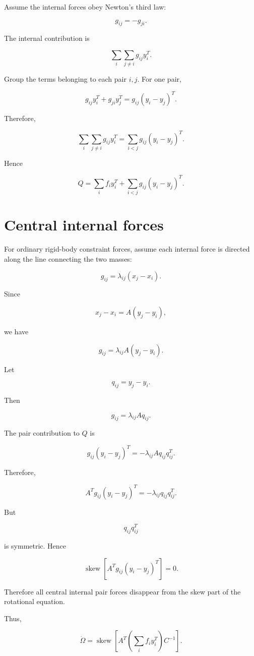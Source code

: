 \documentclass{article}
\begin{document}
Assume the internal forces obey Newton's third law:

\[
g_{ij}=-g_{ji}.
\]

The internal contribution is

\[
\sum_i\sum_{j\ne i}g_{ij}y_i^T.
\]

Group the terms belonging to each pair \(i,j\). For one pair,

\[
g_{ij}y_i^T+g_{ji}y_j^T = g_{ij}(y_i-y_j)^T.
\]

Therefore,

\[
\sum_i\sum_{j\ne i}g_{ij}y_i^T = \sum_{i<j}g_{ij}(y_i-y_j)^T.
\]

Hence

\[
Q = \sum_i f_i y_i^T + \sum_{i<j}g_{ij}(y_i-y_j)^T.
\]

\section{Central internal forces}

For ordinary rigid-body constraint forces, assume each internal force is directed along the line connecting the two masses:

\[
g_{ij} = \lambda_{ij}(x_j-x_i).
\]

Since

\[
x_j-x_i = A(y_j-y_i),
\]

we have

\[
g_{ij} = \lambda_{ij}A(y_j-y_i).
\]

Let

\[
q_{ij}=y_j-y_i.
\]

Then

\[
g_{ij} = \lambda_{ij}Aq_{ij}.
\]

The pair contribution to \(Q\) is

\[
g_{ij}(y_i-y_j)^T = -\lambda_{ij}Aq_{ij}q_{ij}^T.
\]

Therefore,

\[
A^Tg_{ij}(y_i-y_j)^T = -\lambda_{ij}q_{ij}q_{ij}^T.
\]

But

\[
q_{ij}q_{ij}^T
\]

is symmetric. Hence

\[
\operatorname{skew} \left[ A^Tg_{ij}(y_i-y_j)^T \right] = 0.
\]

Therefore all central internal pair forces disappear from the skew part of the rotational equation.

Thus,

\[
\dot\Omega = \operatorname{skew} \left[ A^T \left( \sum_i f_i y_i^T \right) C^{-1} \right].
\]
\end{document}
